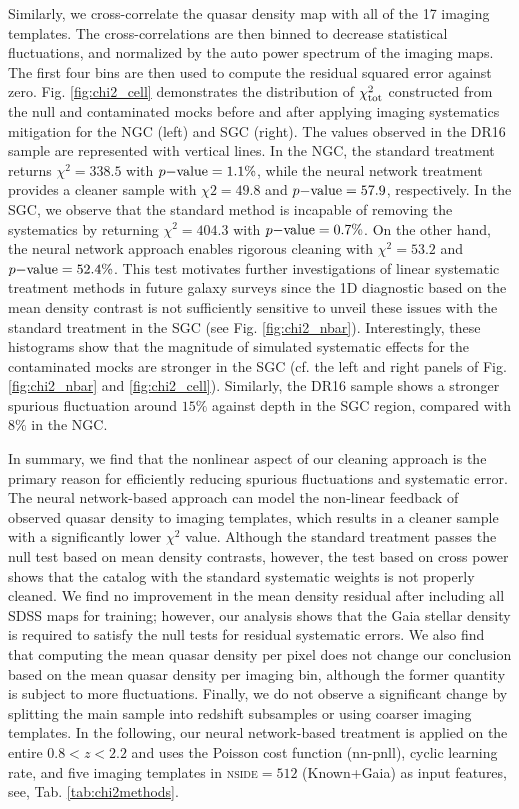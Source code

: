 Similarly, we cross-correlate the quasar density map with all of the 17 imaging templates. The cross-correlations are then binned to decrease statistical fluctuations, and normalized by the auto power spectrum of the imaging maps. The first four bins are then used to compute the residual squared error against zero. Fig. \ref{fig:chi2_cell} demonstrates the distribution of $\chi^{2}_{\rm tot}$ constructed from the null and contaminated mocks before and after applying imaging systematics mitigation for the NGC (left) and SGC (right). The values observed in the DR16 sample are represented with vertical lines. In the NGC, the standard treatment returns $\chi^{2}=338.5$ with $p{\rm -value}=1.1\%$, while the neural network treatment provides a cleaner sample with $\chi{2}=49.8$ and $p{\rm -value}=57.9$, respectively. In the SGC, we observe that the standard method is incapable of removing the systematics by returning $\chi^{2}=404.3$ with $p{\rm -value}=0.7\%$. On the other hand, the neural network approach enables rigorous cleaning with $\chi^{2}=53.2$ and $p{\rm -value}=52.4\%$. This test motivates further investigations of linear systematic treatment methods in future galaxy surveys since the 1D diagnostic based on the mean density contrast is not sufficiently sensitive to unveil these issues with the standard treatment in the SGC (see Fig. \ref{fig:chi2_nbar}). Interestingly, these histograms show that the magnitude of simulated systematic effects for the contaminated mocks are stronger in the SGC (cf. the left and right panels of Fig. \ref{fig:chi2_nbar} and \ref{fig:chi2_cell}). Similarly, the DR16 sample shows a stronger spurious fluctuation around $15\%$ against depth in the SGC region, compared with $8\%$ in the NGC.

In summary, we find that the nonlinear aspect of our cleaning approach is the primary reason for efficiently reducing spurious fluctuations and systematic error. The neural network-based approach can model the non-linear feedback of observed quasar density to imaging templates, which results in a cleaner sample with a significantly lower $\chi^{2}$ value. Although the standard treatment passes the null test based on mean density contrasts, however, the test based on cross power shows that the catalog with the standard systematic weights is not properly cleaned. We find no improvement in the mean density residual after including all SDSS maps for training; however, our analysis shows that the Gaia stellar density is required to satisfy the null tests for residual systematic errors. We also find that computing the mean quasar density per pixel does not change our conclusion based on the mean quasar density per imaging bin, although the former quantity is subject to more fluctuations. Finally, we do not observe a significant change by splitting the main sample into redshift subsamples or using coarser imaging templates. In the following, our neural network-based treatment is applied on the entire $0.8<z<2.2$ and uses the Poisson cost function (nn-pnll), cyclic learning rate, and five imaging templates in \textsc{nside}$=512$ (Known+Gaia) as input features, see, Tab. \ref{tab:chi2methods}.

